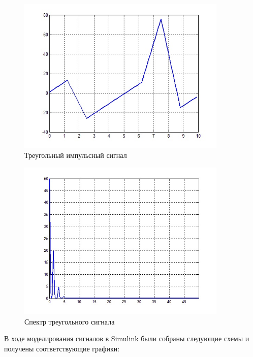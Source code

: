 \documentclass[10pt,a4paper]{article}
\begin{document}
\begin{figure}[h]
\centering
\includegraphics[width=10cm]{5_5} 
\caption{Треугольный импульсный сигнал} 
\label{fig.l5_3} 
\end{figure}
\begin{figure}[h]
\centering
\includegraphics[width=10cm]{5_6}
\caption{Спектр треугольного сигнала} 
\label{fig.l5_4} 
\end{figure}

В ходе моделирования сигналов в Simulink были собраны следующие схемы и получены соответствующие графики:
\end{document}
